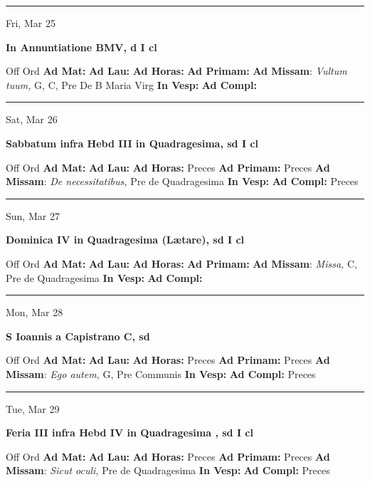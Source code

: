 \documentclass[letterpaper, 10pt]{article}
\begin{document}
\hrule
\begin{center}
Fri, Mar 25
\end{center}\textbf{ \large In Annuntiatione BMV, \textnormal{\normalsize d I cl}}
\begin{justify}
Off Ord
\textbf{Ad Mat: }
\textbf{Ad Lau: }
\textbf{Ad Horas: }
\textbf{Ad Primam: }
\textbf{Ad Missam}: \textit{Vultum tuum,} G, C, Pre De B Maria Virg
\textbf{In Vesp: }
\textbf{Ad Compl: }\end{justify}



\hrule
\begin{center}
Sat, Mar 26
\end{center}\textbf{ \large Sabbatum infra Hebd III in Quadragesima, \textnormal{\normalsize sd I cl}}
\begin{justify}
Off Ord
\textbf{Ad Mat: }
\textbf{Ad Lau: }
\textbf{Ad Horas: }Preces
\textbf{Ad Primam: }Preces
\textbf{Ad Missam}: \textit{De necessitatibus,} Pre de Quadragesima
\textbf{In Vesp: }
\textbf{Ad Compl: }Preces\end{justify}



\hrule
\begin{center}
Sun, Mar 27
\end{center}\textbf{ \large Dominica IV in Quadragesima (Lætare), \textnormal{\normalsize sd I cl}}
\begin{justify}
Off Ord
\textbf{Ad Mat: }
\textbf{Ad Lau: }
\textbf{Ad Horas: }
\textbf{Ad Primam: }
\textbf{Ad Missam}: \textit{Missa,} C, Pre de Quadragesima
\textbf{In Vesp: }
\textbf{Ad Compl: }\end{justify}



\hrule
\begin{center}
Mon, Mar 28
\end{center}\textbf{ \large S Ioannis a Capistrano C, \textnormal{\normalsize sd}}
\begin{justify}
Off Ord
\textbf{Ad Mat: }
\textbf{Ad Lau: }
\textbf{Ad Horas: }Preces
\textbf{Ad Primam: }Preces
\textbf{Ad Missam}: \textit{Ego autem,} G, Pre Communis
\textbf{In Vesp: }
\textbf{Ad Compl: }Preces\end{justify}



\hrule
\begin{center}
Tue, Mar 29
\end{center}\textbf{ \large Feria III infra Hebd IV in Quadragesima , \textnormal{\normalsize sd I cl}}
\begin{justify}
Off Ord
\textbf{Ad Mat: }
\textbf{Ad Lau: }
\textbf{Ad Horas: }Preces
\textbf{Ad Primam: }Preces
\textbf{Ad Missam}: \textit{Sicut oculi,} Pre de Quadragesima
\textbf{In Vesp: }
\textbf{Ad Compl: }Preces\end{justify}
\end{document}
